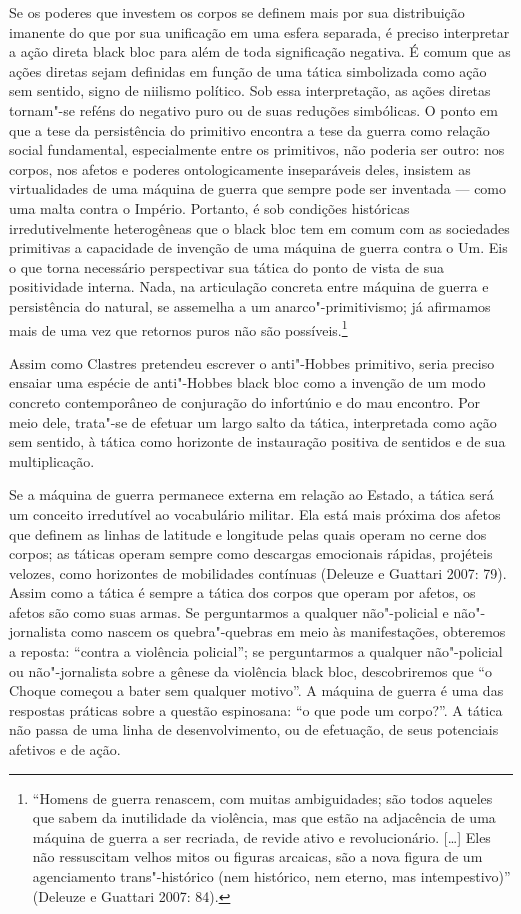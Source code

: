 Se os poderes que investem os corpos se definem
mais por sua distribuição imanente do que por sua unificação em uma
esfera separada, é preciso interpretar a ação direta black bloc para
além de toda significação negativa. É comum que as ações diretas sejam
definidas em função de uma tática simbolizada como ação sem sentido,
signo de niilismo político. Sob essa interpretação, as ações diretas
tornam"-se reféns do negativo puro ou de suas reduções simbólicas. O
ponto em que a tese da persistência do primitivo encontra a tese da
guerra como relação social fundamental, especialmente entre os
primitivos, não poderia ser outro: nos corpos, nos afetos e poderes
ontologicamente inseparáveis deles, insistem as virtualidades de uma
máquina de guerra que sempre pode ser inventada --- como uma malta contra
o Império. Portanto, é sob condições históricas irredutivelmente
heterogêneas que o black bloc tem em comum com as sociedades primitivas
a capacidade de invenção de uma máquina de guerra contra o Um. Eis o que
torna necessário perspectivar sua tática do ponto de vista de sua
positividade interna. Nada, na articulação concreta entre máquina de
guerra e persistência do natural, se assemelha a um anarco"-primitivismo;
já afirmamos mais de uma vez que retornos puros não são
possíveis.\footnote{``Homens de guerra
  renascem, com muitas ambiguidades; são todos aqueles que sabem da
  inutilidade da violência, mas que estão na adjacência de uma máquina
  de guerra a ser recriada, de revide ativo e revolucionário. {[}\ldots{}{]}
  Eles não ressuscitam velhos mitos ou figuras arcaicas, são a nova
  figura de um agenciamento trans"-histórico (nem histórico, nem eterno,
  mas intempestivo)'' (Deleuze e Guattari 2007: 84).}

Assim como Clastres pretendeu escrever o anti"-Hobbes primitivo, seria
preciso ensaiar uma espécie de anti"-Hobbes black bloc como a invenção de
um modo concreto contemporâneo de conjuração do infortúnio e do mau
encontro. Por meio dele, trata"-se de efetuar um largo salto da tática,
interpretada como ação sem sentido, à tática como horizonte de
instauração positiva de sentidos e de sua multiplicação.

Se a máquina de guerra permanece externa em relação ao Estado, a tática
será um conceito irredutível ao vocabulário militar. Ela está mais
próxima dos afetos que definem as linhas de latitude e longitude pelas
quais operam no cerne dos corpos; as táticas operam sempre como
descargas emocionais rápidas, projéteis velozes, como horizontes de
mobilidades contínuas (Deleuze e Guattari 2007: 79). Assim como a
tática é sempre a tática dos corpos que operam por afetos, os afetos são
como suas armas. Se perguntarmos a qualquer não"-policial e
não"-jornalista como nascem os quebra"-quebras em meio às manifestações,
obteremos a reposta: ``contra a violência policial''; se perguntarmos a
qualquer não"-policial ou não"-jornalista sobre a gênese da violência
black bloc, descobriremos que ``o Choque começou a bater sem qualquer
motivo''. A máquina de guerra é uma das respostas práticas sobre a
questão espinosana: ``o que pode um corpo?''. A tática não passa de uma
linha de desenvolvimento, ou de efetuação, de seus potenciais afetivos e
de ação.


